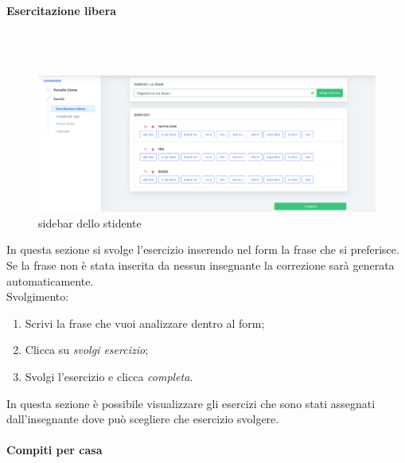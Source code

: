         
               
	\newpage
        \paragraph{Esercitazione libera}\mbox{}\\ \\        
        	\begin{figure}[H]
                \centering
                \includegraphics[width=17cm]{sez/img/studente/EsercitazioneLiberaEsegui.png} 
                \caption{sidebar dello stidente}\label{fig:1}
        	\end{figure}
          In questa sezione si svolge l'esercizio inserendo nel form la frase che 
        si preferisce. Se la frase non è stata inserita da nessun insegnante la 
        correzione sarà generata automaticamente.
        \\ Svolgimento:
        	\begin{enumerate}        
            	\item Scrivi la frase che vuoi analizzare dentro al form;
            	\item Clicca su \textit{svolgi esercizio};
            	\item Svolgi l'esercizio e clicca \textit{completa}.
        	\end{enumerate}
           In questa sezione è possibile visualizzare gli esercizi che sono stati assegnati dall'insegnante dove può scegliere che esercizio svolgere.
  
        
        
        
        
        
  		\paragraph{Compiti per casa}\mbox{}\\ \\
 
